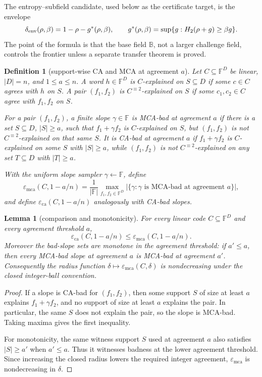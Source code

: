 \documentclass[a4paper,11pt]{amsart}
\newtheorem{lemma}[lemma]{Lemma}
\newtheorem{definition}[definition]{Definition}
\theoremstyle{remark}
\newcommand{\F}{\mathbb F}
\newcommand{\B}{\mathbb B}
\newcommand{\emca}{\varepsilon_{\mathrm{mca}}}
\newcommand{\eca}{\varepsilon_{\mathrm{ca}}}
\newcommand{\Htwo}{H_2}
\begin{document}
The entropy--subfield candidate, used below as the certificate target, is the envelope
\[
        \delta_{\rm env}(\rho,\beta)=1-\rho-g^*(\rho,\beta),
        \qquad
        g^*(\rho,\beta)=\sup\{g:\Htwo(\rho+g)\ge \beta g\}.
\]
The point of the formula is that the base field \(\B\), not a larger challenge field, controls the frontier unless a separate transfer theorem is proved.

\begin{definition}[support-wise CA and MCA at agreement \(a\)]\label{def:ca-mca}
Let \(C\subseteq\F^D\) be linear, \(|D|=n\), and \(1\le a\le n\).  A word \(h\in\F^D\) is \(C\)-explained on \(S\subseteq D\) if some \(c\in C\) agrees with \(h\) on \(S\).  A pair \((f_1,f_2)\) is \(C^{\equiv2}\)-explained on \(S\) if some \(c_1,c_2\in C\) agree with \(f_1,f_2\) on \(S\).

For a pair \((f_1,f_2)\), a finite slope \(\gamma\in\F\) is MCA-bad at agreement \(a\) if there is a set \(S\subseteq D\), \(|S|\ge a\), such that \(f_1+\gamma f_2\) is \(C\)-explained on \(S\), but \((f_1,f_2)\) is not \(C^{\equiv2}\)-explained on that same \(S\).  It is CA-bad at agreement \(a\) if \(f_1+\gamma f_2\) is \(C\)-explained on some \(S\) with \(|S|\ge a\), while \((f_1,f_2)\) is not \(C^{\equiv2}\)-explained on any set \(T\subseteq D\) with \(|T|\ge a\).

With the uniform slope sampler \(\gamma\leftarrow\F\), define
\[
        \emca(C,1-a/n)
        =
        \frac{1}{|\F|}
        \max_{f_1,f_2\in\F^D}
        |\{\gamma:\gamma\text{ is MCA-bad at agreement }a\}|,
\]
and define \(\eca(C,1-a/n)\) analogously with CA-bad slopes.
\end{definition}

\begin{lemma}[comparison and monotonicity]\label{lem:basic-staircase}
For every linear code \(C\subseteq\F^D\) and every agreement threshold \(a\),
\[
        \eca(C,1-a/n)\le \emca(C,1-a/n).
\]
Moreover the bad-slope sets are monotone in the agreement threshold: if \(a'\le a\), then every MCA-bad slope at agreement \(a\) is MCA-bad at agreement \(a'\).  Consequently the radius function \(\delta\mapsto\emca(C,\delta)\) is nondecreasing under the closed integer-ball convention.
\end{lemma}

\begin{proof}
If a slope is CA-bad for \((f_1,f_2)\), then some support \(S\) of size at least \(a\) explains \(f_1+\gamma f_2\), and no support of size at least \(a\) explains the pair.  In particular, the same \(S\) does not explain the pair, so the slope is MCA-bad.  Taking maxima gives the first inequality.

For monotonicity, the same witness support \(S\) used at agreement \(a\) also satisfies \(|S|\ge a'\) when \(a'\le a\).  Thus it witnesses badness at the lower agreement threshold.  Since increasing the closed radius lowers the required integer agreement, \(\emca\) is nondecreasing in \(\delta\).
\end{proof}
\end{document}
